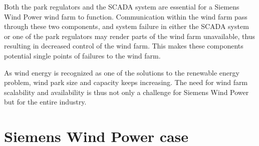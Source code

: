 
Both the park regulators and the SCADA system are essential for a Siemens Wind Power wind farm to function. Communication within the wind farm pass through these two components, and system failure in either the SCADA system or one of the park regulators may render parts of the wind farm unavailable, thus resulting in decreased control of the wind farm. This makes these components potential single points of failures to the wind farm. 


As wind energy is recognized as one of the solutions to the renewable energy problem, wind park size and capacity keeps increasing.
The need for wind farm scalability and availability is thus not only a challenge for Siemens Wind Power but for the entire industry.

\section{Siemens Wind Power case}

